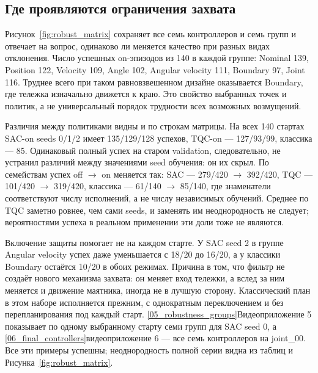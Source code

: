 \subsection{Где проявляются ограничения захвата}
Рисунок~\ref{fig:robust_matrix} сохраняет все семь контроллеров и семь групп и отвечает на вопрос, одинаково ли меняется качество при разных видах отклонения. Число успешных on-эпизодов из 140 в каждой группе: Nominal 139, Position 122, Velocity 109, Angle 102, Angular velocity 111, Boundary 97, Joint 116. Труднее всего при таком равновзвешенном дизайне оказывается Boundary, где тележка изначально движется к краю. Это свойство выбранных точек и политик, а не универсальный порядок трудности всех возможных возмущений.

Различия между политиками видны и по строкам матрицы. На всех 140 стартах SAC-on seeds 0/1/2 имеет 135/129/128 успехов, TQC-on — 127/93/99, классика — 85. Одинаковый полный успех на старом validation, следовательно, не устранил различий между значениями seed обучения: он их скрыл. По семействам успех off $\to$ on меняется так: SAC — 279/420 $\to$ 392/420, TQC — 101/420 $\to$ 319/420, классика — 61/140 $\to$ 85/140, где знаменатели соответствуют числу исполнений, а не числу независимых обучений. Среднее по TQC заметно ровнее, чем сами seeds, и заменять им неоднородность не следует; вероятностями успеха в реальном применении эти доли тоже не являются.

Включение защиты помогает не на каждом старте. У SAC seed 2 в группе Angular velocity успех даже уменьшается с 18/20 до 16/20, а у классики Boundary остаётся 10/20 в обоих режимах. Причина в том, что фильтр не создаёт нового механизма захвата: он меняет вход тележки, а вслед за ним меняется и движение маятника, иногда не в лучшую сторону. Классический план в этом наборе исполняется прежним, с однократным переключением и без перепланирования под каждый старт.
\vref{05_robustness_groups}{Видеоприложение 5} показывает по одному выбранному старту семи групп для SAC seed 0, а
\vref{06_final_controllers}{видеоприложение 6} — все семь контроллеров на joint\_00. Все эти примеры успешны; неоднородность полной серии видна из таблиц и Рисунка~\ref{fig:robust_matrix}.

